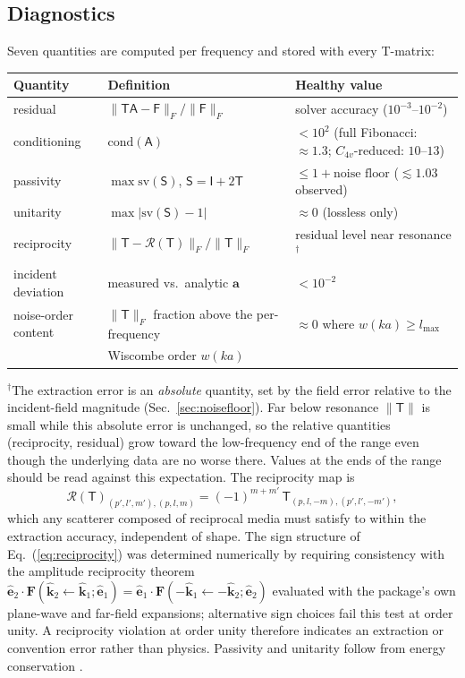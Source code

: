 \documentclass[11pt]{article}
\newcommand{\khat}{\hat{\mathbf{k}}}
\newcommand{\ehat}{\hat{\mathbf{e}}}
\begin{document}
\subsection{Diagnostics}
\label{sec:diagnostics}
Seven quantities are computed per frequency and stored with every
T-matrix:
\begin{center}
\begin{tabular}{lll}
\toprule
Quantity & Definition & Healthy value\\
\midrule
residual & $\|\mathsf{T}\mathsf{A}-\mathsf{F}\|_F / \|\mathsf{F}\|_F$ &
 solver accuracy ($10^{-3}$--$10^{-2}$)\\
conditioning & $\mathrm{cond}(\mathsf{A})$ & $<10^2$ (full Fibonacci:
 $\approx 1.3$; $C_{4v}$-reduced: $10$--$13$)\\
passivity & $\max \mathrm{sv}(\mathsf{S})$, $\mathsf{S} = \mathsf{I} +
 2\mathsf{T}$ & $\le 1 + \text{noise floor}$ ($\lesssim 1.03$
 observed)\\
unitarity & $\max|\mathrm{sv}(\mathsf{S}) - 1|$ & $\approx 0$ (lossless
 only)\\
reciprocity & $\|\mathsf{T} - \mathcal{R}(\mathsf{T})\|_F /
 \|\mathsf{T}\|_F$ & residual level near resonance$^{\dagger}$\\
incident deviation & measured vs.\ analytic $\mathbf{a}$ &
 $< 10^{-2}$\\
noise-order content & $\|\mathsf{T}\|_F$ fraction above the
 per-frequency & $\approx 0$ where $w(ka) \ge l_{\max}$\\
 & Wiscombe order $w(k a)$ & \\
\bottomrule
\end{tabular}
\end{center}
$^{\dagger}$The extraction error is an \emph{absolute} quantity, set by
the field error relative to the incident-field magnitude
(Sec.~\ref{sec:noisefloor}).  Far below resonance $\|\mathsf{T}\|$ is
small while this absolute error is unchanged, so the relative
quantities (reciprocity, residual) grow toward the low-frequency end
of the range even though the underlying data are no worse there.
Values at the ends of the range should be read against this
expectation.
The reciprocity map is
\begin{equation}
\mathcal{R}(\mathsf{T})_{(p',l',m'),(p,l,m)}
 = (-1)^{m+m'}\, \mathsf{T}_{(p,l,-m),(p',l',-m')},
\label{eq:reciprocity}
\end{equation}
which any scatterer composed of reciprocal media must satisfy to within
the extraction accuracy, independent of shape.  The sign structure of
Eq.~(\ref{eq:reciprocity}) was determined numerically by requiring
consistency with the amplitude reciprocity theorem
$\ehat_2\cdot\mathbf{F}(\khat_2\leftarrow\khat_1;\ehat_1) =
\ehat_1\cdot\mathbf{F}(-\khat_1\leftarrow-\khat_2;\ehat_2)$
\cite{Saxon1955} evaluated with the package's own plane-wave and
far-field expansions; alternative sign choices fail this test at order
unity.  A reciprocity violation at order unity therefore indicates an
extraction or convention error rather than physics.  Passivity and
unitarity follow from energy conservation \cite{Waterman1971}.
\end{document}
